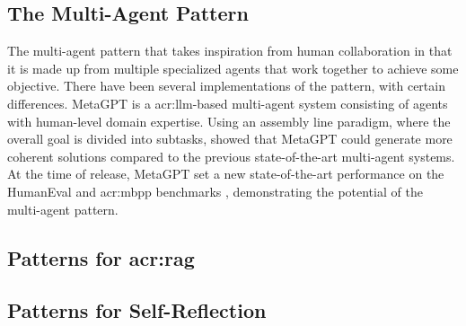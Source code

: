 \subsection{The Multi-Agent Pattern}

The multi-agent pattern that takes inspiration from human collaboration in that it is made up from multiple specialized agents that work together to achieve some objective. There have been several implementations of the pattern, with certain differences. MetaGPT \citep{hongMetaGPTMetaProgramming2023} is a \acrshort{acr:llm}-based multi-agent system consisting of agents with human-level domain expertise. Using an assembly line paradigm, where the overall goal is divided into subtasks, \citeauthor{hongMetaGPTMetaProgramming2023} showed that MetaGPT could generate more coherent solutions compared to the previous state-of-the-art multi-agent systems. At the time of release, MetaGPT set a new state-of-the-art performance on the HumanEval and \acrshort{acr:mbpp} benchmarks \citep[7]{hongMetaGPTMetaProgramming2023}, demonstrating the potential of the multi-agent pattern.

\subsection[Patterns for Retrieval-Augmented Generation]{Patterns for \acrlong{acr:rag}}

\subsection{Patterns for Self-Reflection}







\glsresetall